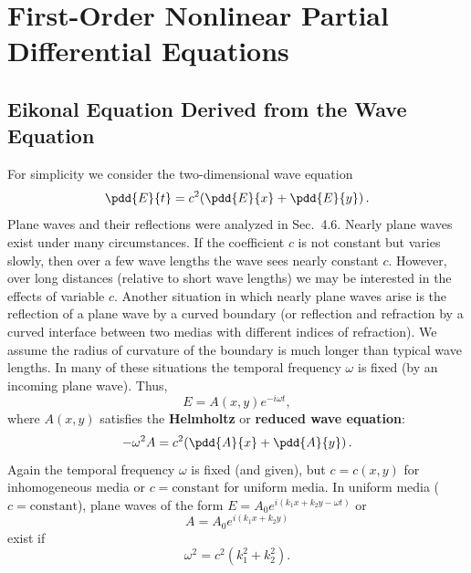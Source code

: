 \section{First-Order Nonlinear Partial Differential Equations}
\label{sec:nonlinear-first-order}

\subsection{Eikonal Equation Derived from the Wave Equation}
\label{sec:eikonal}

For simplicity we consider the two-dimensional wave equation
\begin{equation}
\label{eq:12.7.1}
\pdd{E}{t} = c^2\!\left(\pdd{E}{x} + \pdd{E}{y}\right).
\end{equation}
Plane waves and their reflections were analyzed in Sec.~4.6.  Nearly plane waves exist under many circumstances.  If the coefficient $c$ is not constant but varies slowly, then over a few wave lengths the wave sees nearly constant $c$.  However, over long distances (relative to short wave lengths) we may be interested in the effects of variable $c$.  Another situation in which nearly plane waves arise is the reflection of a plane wave by a curved boundary (or reflection and refraction by a curved interface between two medias with different indices of refraction).  We assume the radius of curvature of the boundary is much longer than typical wave lengths.  In many of these situations the temporal frequency $\omega$ is fixed (by an incoming plane wave).  Thus,
\begin{equation}
\label{eq:12.7.2}
E = A(x,y)e^{-i\omega t},
\end{equation}
where $A(x,y)$ satisfies the \textbf{Helmholtz} or \textbf{reduced wave equation}:
\begin{equation}
\label{eq:12.7.3}
-\omega^2 A = c^2\!\left(\pdd{A}{x} + \pdd{A}{y}\right).
\end{equation}
Again the temporal frequency $\omega$ is fixed (and given), but $c = c(x,y)$ for inhomogeneous media or $c = \text{constant}$ for uniform media.  In uniform media ($c = \text{constant}$), plane waves of the form $E = A_0 e^{i(k_1 x + k_2 y - \omega t)}$ or
\begin{equation}
\label{eq:12.7.4}
A = A_0 e^{i(k_1 x + k_2 y)}
\end{equation}
exist if
\begin{equation}
\label{eq:12.7.5}
\omega^2 = c^2(k_1^2 + k_2^2).
\end{equation}
